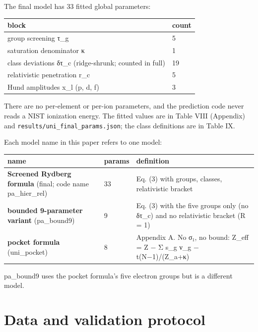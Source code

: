 \documentclass[aps,pra,preprint,superscriptaddress,amsmath,amssymb]{revtex4-2}
\begin{document}
The final model has 33 fitted global parameters:


\begin{table}[h]
\footnotesize
\begin{ruledtabular}
\begin{tabular}{ll}
block & count \\
\hline
group screening τ\_g & 5 \\
saturation denominator κ & 1 \\
class deviations δτ\_c (ridge-shrunk; counted in full) & 19 \\
relativistic penetration r\_c & 5 \\
Hund amplitudes x\_l (p, d, f) & 3 \\
\end{tabular}
\end{ruledtabular}
\end{table}


There are no per-element or per-ion parameters, and the prediction code never reads a NIST ionization energy. The fitted values are in Table VIII (Appendix) and \texttt{results/uni\_final\_params.json}; the class definitions are in Table IX.


Each model name in this paper refers to one model:


\begin{table}[h]
\footnotesize
\begin{ruledtabular}
\begin{tabular}{lll}
name & params & definition \\
\hline
\textbf{Screened Rydberg formula} (final; code name pa\_hier\_rel) & 33 & Eq. (3) with groups, classes, relativistic bracket \\
\textbf{bounded 9-parameter variant} (pa\_bound9) & 9 & Eq. (3) with the five groups only (no δτ\_c) and no relativistic bracket (R = 1) \\
\textbf{pocket formula} (uni\_pocket) & 8 & Appendix A. No σ₁, no bound: Z\_eff = Z − Σ s\_g ν\_g − t(N−1)/(Z\_a+κ) \\
\end{tabular}
\end{ruledtabular}
\end{table}


pa\_bound9 uses the pocket formula's five electron groups but is a different model.


\section{Data and validation protocol}
\end{document}
